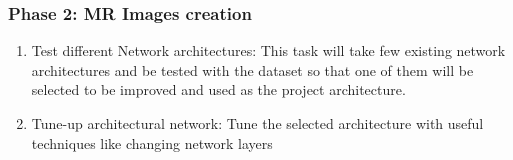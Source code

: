 \subsubsection*{Phase 2: MR Images creation}

\begin{enumerate}
    \item Test different Network architectures: This task will take few existing network architectures and be tested with the dataset so that one of them will be selected to be improved and used as the project architecture.
    \item Tune-up architectural network: Tune the selected architecture with useful techniques like changing network layers
\end{enumerate}